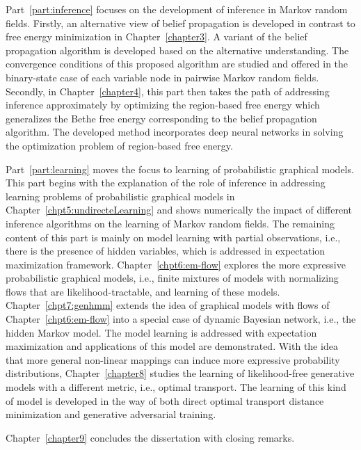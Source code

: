Part~\ref{part:inference} focuses on the development of inference in Markov random fields. Firstly, an alternative view of belief propagation is developed in contrast to free energy minimization in Chapter~\ref{chapter3}. A variant of the belief propagation algorithm is developed based on the alternative understanding. The convergence conditions of this proposed algorithm are studied and offered in the binary-state case of each variable node in pairwise Markov random fields. Secondly, in Chapter~\ref{chapter4}, this part then takes the path of addressing inference approximately by optimizing the region-based free energy which generalizes the Bethe free energy corresponding to the belief propagation algorithm. The developed method incorporates deep neural networks in solving the optimization problem of region-based free energy.

Part~\ref{part:learning} moves the focus to learning of probabilistic graphical models. This part begins with the explanation of the role of inference in addressing learning problems of probabilistic graphical models in Chapter~\ref{chpt5:undirecteLearning} and shows numerically the impact of different inference algorithms on the learning of Markov random fields. The remaining content of this part is mainly on model learning with partial observations, i.e., there is the presence of hidden variables, which is addressed in expectation maximization framework. Chapter~\ref{chpt6:em-flow} explores the more expressive probabilistic graphical models, i.e., finite mixtures of models with normalizing flows that are likelihood-tractable, and learning of these models. Chapter~\ref{chpt7:genhmm} extends the idea of graphical models with flows of Chapter~\ref{chpt6:em-flow} into a special case of dynamic Bayesian network, i.e., the hidden Markov model. The model learning is addressed with expectation maximization and applications of this model are demonstrated. With the idea that more general non-linear mappings can induce more expressive probability distributions, Chapter~\ref{chapter8} studies the learning of likelihood-free generative models with a different metric, i.e., optimal transport. The learning of this kind of model is developed in the way of both direct optimal transport distance minimization and generative adversarial training.

Chapter~\ref{chapter9} concludes the dissertation with closing remarks.
